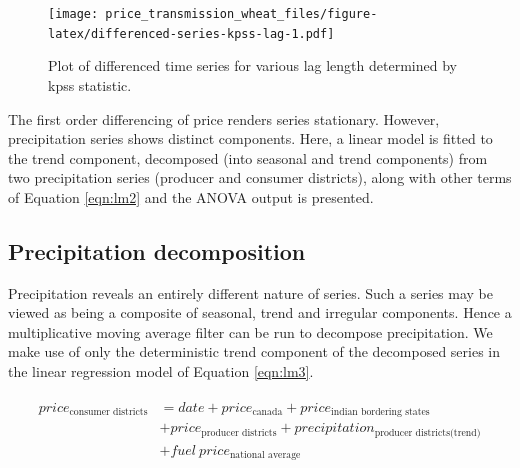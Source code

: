 \documentclass[12pt,]{article}
\begin{document}
\begin{figure}
\centering
\texttt{[image: price\_transmission\_wheat\_files/figure-latex/differenced-series-kpss-lag-1.pdf]}
\caption{\label{fig:differenced-series-kpss-lag}Plot of differenced time series for various lag length determined by kpss statistic.}
\end{figure}

The first order differencing of price renders series stationary. However, precipitation series shows distinct components. Here, a linear model is fitted to the trend component, decomposed (into seasonal and trend components) from two precipitation series (producer and consumer districts), along with other terms of Equation \ref{eqn:lm2} and the ANOVA output is presented.

\hypertarget{precipitation-decomposition}{%
\subsection{Precipitation decomposition}\label{precipitation-decomposition}}

Precipitation reveals an entirely different nature of series. Such a series may be viewed as being a composite of seasonal, trend and irregular components. Hence a multiplicative moving average filter can be run to decompose precipitation. We make use of only the deterministic trend component of the decomposed series in the linear regression model of Equation \ref{eqn:lm3}.

\begin{equation}
\label{eqn:lm3}
\begin{aligned}
\begin{split}
price_{\textrm{consumer districts}} &= date + price_{\textrm{canada}} + price_{\textrm{indian bordering states}} \\ &+
price_{\textrm{producer districts}} + precipitation_{\textrm{producer districts(trend)}} \\ &+ fuel~price_{\textrm{national average}}
\end{split}
\end{aligned}
\end{equation}
\end{document}
